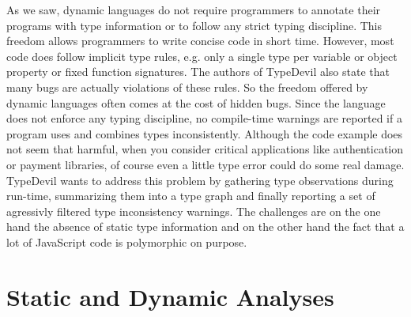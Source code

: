 \documentclass[runningheads,a4paper]{llncs}
\begin{document}
As we saw, dynamic languages do not require programmers to annotate their programs with type information or to follow any strict typing discipline. 
This freedom allows programmers to write concise code in short time. 
However, most code does follow implicit type rules, e.g. only a single type per variable or object property or fixed function signatures.
The authors of TypeDevil also state that many bugs are actually violations of these rules.
So the freedom offered by dynamic languages often comes at the cost of hidden bugs. Since the language does not enforce any typing discipline, no compile-time warnings are reported if a program uses and combines types inconsistently.
Although the code example does not seem that harmful, when you consider critical applications like authentication or payment libraries, of course even a little type error could do some real damage. \\
TypeDevil wants to address this problem by gathering type observations during run-time, summarizing them into a type graph and finally reporting a set of agressivly filtered type inconsistency warnings.
The challenges are on the one hand the absence of static type information and on the other hand the fact that a lot of JavaScript code is polymorphic on purpose.

\section{Static and Dynamic Analyses} \label{staticDynamicAnalysis}
\end{document}
